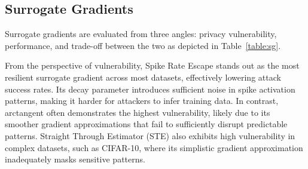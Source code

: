 




\subsection{Surrogate Gradients}
\noindent

Surrogate gradients are evaluated from three angles: privacy vulnerability, performance, and trade-off between the two as depicted in Table~\ref{table:sg}.

From the perspective of vulnerability, Spike Rate Escape stands out as the most resilient surrogate gradient across most datasets, effectively lowering attack success rates. Its decay parameter introduces sufficient noise in spike activation patterns, making it harder for attackers to infer training data. In contrast, arctangent often demonstrates the highest vulnerability, likely due to its smoother gradient approximations that fail to sufficiently disrupt predictable patterns. Straight Through Estimator (STE) also exhibits high vulnerability in complex datasets, such as CIFAR-10, where its simplistic gradient approximation inadequately masks sensitive patterns.


